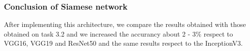\documentclass{article}
\begin{document}

\subsubsection{Conclusion of Siamese network}
After implementing this architecture, we compare the results obtained with those obtained on task 3.2 and we increased the accurancy about 2 - 3\% respect to VGG16, VGG19 and ResNet50 and the same results respect to the InceptionV3.
\end{document}
